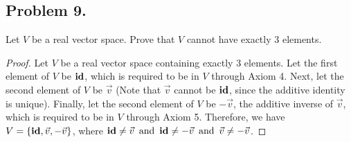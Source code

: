 \newpage

\subsection*{Problem 9.}
Let $V$ be a real vector space. Prove that $V$ cannot have exactly 3 elements.

\begin{proof}
  Let $V$ be a real vector space containing exactly 3 elements. Let the first element of $V$ be $\operatorname{\textbf{id}}$, which is required to be in $V$ through Axiom 4. Next, let the second element of $V$ be $\vec{v}$ (Note that $\vec{v}$ cannot be $\operatorname{\textbf{id}}$, since the additive identity is unique). Finally, let the second element of $V$ be $-\vec{v}$, the additive inverse of $\vec{v}$, which is required to be in $V$ through Axiom 5. Therefore, we have $V = \{\operatorname{\textbf{id}}, \vec{v}, -\vec{v}\}$, where $\operatorname{\textbf{id}} \neq \vec{v} \operatorname{~\text{and}~} \operatorname{\textbf{id}} \neq -\vec{v} \operatorname{~\text{and}~} \vec{v} \neq -\vec{v}$.


\end{proof}
